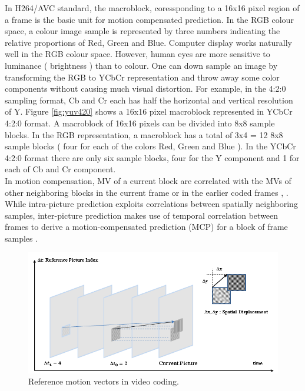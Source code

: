 	In H264/AVC standard, the macroblock, coressponding to a 16x16 pixel region of a frame is the basic unit for motion compensated prediction. In the RGB colour space, a colour image sample is represented by three numbers indicating the relative proportions of Red, Green and Blue. Computer display works naturally well in the RGB colour space. However, human eyes are more sensitive to luminance ( brightness ) than to colour. One can down sample an image by transforming the RGB to YCbCr representation and throw away some color components without causing much visual distortion. For example, in the 4:2:0 sampling format, Cb and Cr each has half the horizontal and vertical resolution of Y. Figure \ref{fig:yuv420} shows a 16x16 pixel macroblock represented in YCbCr 4:2:0 format. A macroblock of 16x16 pixels can be divided into 8x8 sample blocks. In the RGB representation, a macroblock has a total of 3x4 = 12 8x8 sample blocks ( four for each of the colors Red, Green and Blue ). In the YCbCr 4:2:0 format there are only six sample blocks, four for the Y component and 1 for each of Cb and Cr component.\\
  In  motion compensation, MV of a current block are correlated with the MVs of other neighboring blocks in the current frame or in the earlier coded frames \cite{laroche2008rd}, \cite{jiang2019spatial}. While intra-picture prediction exploits correlations between spatially neighboring samples, inter-picture prediction makes use of temporal correlation between frames to derive a motion-compensated prediction (MCP) for a block of frame samples \cite{bross2014inter}.
\begin{figure}
\centering
 \includegraphics[width=1.0\linewidth]{Figures/mv.png}
 \caption{ Reference motion vectors in video coding.}
 \label{fig:mv}
\end{figure}
